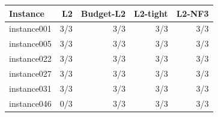 \begin{tabular}{lrrrr}
\toprule
Instance & L2 & Budget-L2 & L2-tight & L2-NF3\\
\midrule
instance001 & 3/3 & 3/3 & 3/3 & 3/3\\
instance005 & 3/3 & 3/3 & 3/3 & 3/3\\
instance022 & 3/3 & 3/3 & 3/3 & 3/3\\
instance027 & 3/3 & 3/3 & 3/3 & 3/3\\
instance031 & 3/3 & 3/3 & 3/3 & 3/3\\
instance046 & 0/3 & 3/3 & 3/3 & 3/3\\
\bottomrule
\end{tabular}
